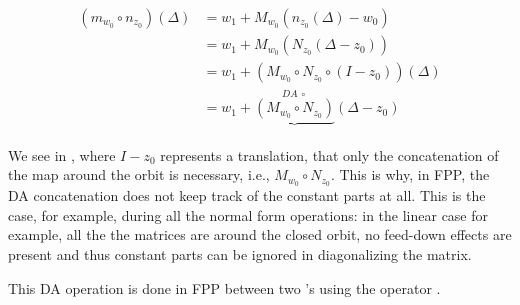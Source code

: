 \documentclass{hitec}     %
\begin{document}
{%
\begin{align} \left({{m}_{{w}_{0}}\circ {n}_{{z}_{0}}}\right)\left({\Delta }\right)&={w}_{1}+{M}_{{w}_{0}}({n}_{{z}_{0}}\left({\Delta }\right)-{w}_{0})\nonumber \\
 &={w}_{1}+{M}_{{w}_{0}}({N}_{{z}_{0}}(\Delta -{z}_{0}))\nonumber \\
 &={w}_{1}+\left({{M}_{{w}_{0}}\circ {N}_{{z}_{0}}\circ (I-{z}_{0})}\right)\left({\Delta }\right) \nonumber \\
 &={w}_{1}+\underbrace{\left({{M}_{{w}_{0}}\circ {N}_{{z}_{0}}}\right)}\limits_{}^{DA\ \circ }\left({\Delta -{z}_{0}}\right)\label{eq:concatda}\end{align}


We see in ,  where $I-{z}_{0}$ represents a translation,  that only the concatenation of the map around the orbit is necessary, i.e., %
%
${M}_{{w}_{0}}\circ {N}_{{z}_{0}}$. This is why, in FPP, the DA concatenation does not keep track of the constant parts at all. This is the case, for example, during all the normal form operations:   in the linear case for example, all the  the matrices are  around the closed orbit, no feed-down effects are present and thus constant parts can be ignored in diagonalizing the matrix.


This DA operation is done in FPP between two 's using the operator \vn{*}.

}
\end{document}
